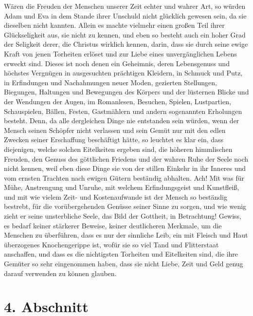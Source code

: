 Wären die Freuden der Menschen unserer Zeit echter und wahrer Art, so würden
Adam und Eva in dem Stande ihrer
Unschuld nicht glücklich gewesen sein, da sie
dieselben nicht kannten. Allein es machte vielmehr einen großen Teil ihrer
Glückseligkeit aus, sie nicht zu kennen, und eben so besteht auch ein hoher
Grad der Seligkeit derer, die Christus wirklich kennen, darin, dass sie durch
seine ewige Kraft von jenen Torheiten erlöset und zur Liebe eines
unvergänglichen Lebens erweckt sind. Dieses ist noch denen ein Geheimnis, deren
Lebensgenuss und höchstes Vergnügen in ausgesuchten prächtigen Kleidern, in
Schmuck und Putz, in Erfindungen und
Nachahmungen neuer Moden, gezierten
Stellungen, Biegungen, Haltungen und Bewegungen des Körpers und der lüsternen
Blicke und der Wendungen der Augen, im Romanlesen, Besuchen,
Spielen,
Lustpartien, Schauspielen, Bällen,
Festen, Gastmählern und andern sogenannten
Erholungen besteht. Denn, da alle dergleichen Dinge nie entstanden sein würden,
wenn der Mensch seinen Schöpfer nicht verlassen und sein Gemüt nur mit den
edlen Zwecken seiner Erschaffung beschäftigt hätte, so leuchtet es klar ein, dass
diejenigen, welche solchen Eitelkeiten ergeben sind, die höheren himmlischen
Freuden, den Genuss des göttlichen Friedens und der wahren Ruhe der Seele noch
nicht kennen, weil eben diese Dinge sie von der stillen Einkehr in ihr Inneres
und vom ernsten Trachten nach ewigen Gütern beständig abhalten. Ach! Mit was für
Mühe, Anstrengung und Unruhe, mit welchem Erfindungsgeist und Kunstfleiß, und
mit wie vielem Zeit- und Kostenaufwande ist der Mensch so beständig bestrebt,
für die vorübergehenden Genüsse seiner Sinne zu sorgen, und wie wenig zieht er
seine unsterbliche Seele, das Bild der Gottheit, in Betrachtung! Gewiss, es
bedarf keiner stärkerer Beweise, keiner deutlicheren Merkmale, um die Menschen zu
überführen, dass es nur der sinnliche Leib, ein mit Fleisch und Haut überzogenes
Knochengerippe ist, wofür sie so viel Tand und
Flitterstaat anschaffen, und dass
es die nichtigsten Torheiten und Eitelkeiten sind, die ihre Gemüter so sehr
eingenommen haben, dass sie nicht Liebe, Zeit und Geld genug darauf
verwenden zu können glauben.

\section{4. Abschnitt} \label{kap17_ab4}

